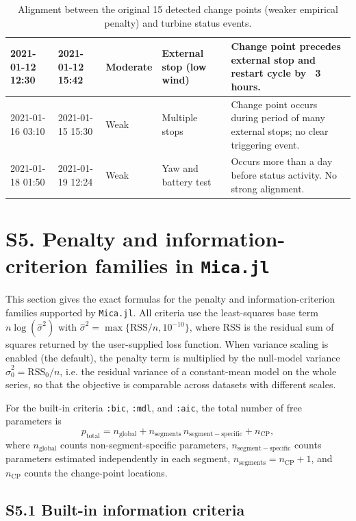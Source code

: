 \documentclass[11pt,a4paper]{article}
\begin{document}
\begin{table}[h!]
{\begin{tabular}{|l|l|l|l|p{7cm}|}
\hline
2021-01-12 12:30 & 2021-01-12 15:42 & Moderate & External stop (low wind) & Change point precedes external stop and restart cycle by ~3 hours. \\
\hline
2021-01-16 03:10 & 2021-01-15 15:30 & Weak & Multiple stops & Change point occurs during period of many external stops; no clear triggering event. \\
\hline
2021-01-18 01:50 & 2021-01-19 12:24 & Weak & Yaw and battery test & Occurs more than a day before status activity. No strong alignment. \\
\hline
\end{tabular}%
}
\caption{Alignment between the original 15 detected change points (weaker empirical penalty) and turbine status events.}
\label{table:turbine-15cp-alignment}
\end{table}


\section*{S5. Penalty and information-criterion families in \texttt{Mica.jl}}

This section gives the exact formulas for the penalty and information-criterion families supported by \texttt{Mica.jl}. All criteria use the least-squares base term \(n \log(\widehat{\sigma}^2)\) with \(\widehat{\sigma}^2 = \max\{\mathrm{RSS}/n, 10^{-10}\}\), where RSS is the residual sum of squares returned by the user-supplied loss function. When variance scaling is enabled (the default), the penalty term is multiplied by the null-model variance \(\widehat{\sigma}^2_0 = \mathrm{RSS}_0/n\), i.e. the residual variance of a constant-mean model on the whole series, so that the objective is comparable across datasets with different scales.

For the built-in criteria \texttt{:bic}, \texttt{:mdl}, and \texttt{:aic}, the total number of free parameters is
\[
p_{\mathrm{total}} = n_{\mathrm{global}} + n_{\mathrm{segments}} \, n_{\mathrm{segment-specific}} + n_{\mathrm{CP}},
\]
where \(n_{\mathrm{global}}\) counts non-segment-specific parameters, \(n_{\mathrm{segment-specific}}\) counts parameters estimated independently in each segment, \(n_{\mathrm{segments}} = n_{\mathrm{CP}} + 1\), and \(n_{\mathrm{CP}}\) counts the change-point locations.

\subsection*{S5.1 Built-in information criteria}
\end{document}
